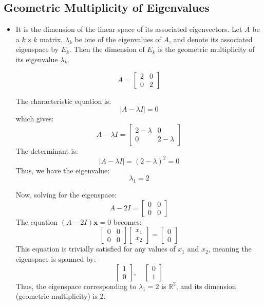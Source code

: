 \documentclass{article}
\begin{document}
\subsection{Geometric Multiplicity of Eigenvalues}
\begin{itemize}
    \item It is the dimension of the linear space of its associated eigenvectors.
    Let \( A \) be a \( k \times k \) matrix, \( \lambda_k \) be one of the eigenvalues of \( A \), and denote its associated eigenspace by \( E_k \). Then the dimension of \( E_k \) is the geometric multiplicity of its eigenvalue \( \lambda_k \).
    
    \[
    A = \begin{bmatrix}
        2 & 0 \\
        0 & 2
    \end{bmatrix}
    \]

    The characteristic equation is:
    \[
    \left| A - \lambda I \right| = 0
    \]
    which gives:
    \[
    A - \lambda I = \begin{bmatrix}
        2 - \lambda & 0 \\
        0 & 2 - \lambda
    \end{bmatrix}
    \]
    The determinant is:
    \[
    \left| A - \lambda I \right| = (2 - \lambda)^2 = 0
    \]
    Thus, we have the eigenvalue:
    \[
    \lambda_1 = 2
    \]

    Now, solving for the eigenspace:
    \[
    A - 2I = \begin{bmatrix}
        0 & 0 \\
        0 & 0
    \end{bmatrix}
    \]
    The equation \( (A - 2I) \mathbf{x} = 0 \) becomes:
    \[
    \begin{bmatrix}
        0 & 0 \\
        0 & 0
    \end{bmatrix}
    \begin{bmatrix}
        x_1 \\
        x_2
    \end{bmatrix}
    = \begin{bmatrix}
        0 \\
        0
    \end{bmatrix}
    \]
    This equation is trivially satisfied for any values of \( x_1 \) and \( x_2 \), meaning the eigenspace is spanned by:
    \[
    \begin{bmatrix} 1 \\ 0 \end{bmatrix}, \quad \begin{bmatrix} 0 \\ 1 \end{bmatrix}
    \]
    Thus, the eigenspace corresponding to \( \lambda_1 = 2 \) is \( \mathbb{R}^2 \), and its dimension (geometric multiplicity) is 2.
    \end{itemize}
\end{document}
